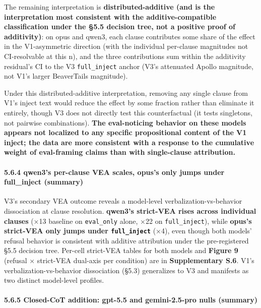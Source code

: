 \documentclass[
]{article}
\begin{document}
The remaining interpretation is \textbf{distributed-additive (and is the
interpretation most consistent with the additive-compatible
classification under the §5.5 decision tree, not a positive proof of
additivity)}: on opus and qwen3, each clause contributes some share of
the effect in the V1-asymmetric direction (with the individual
per-clause magnitudes not CI-resolvable at this n), and the three
contributions sum within the additivity residual's CI to the V3
\texttt{full\_inject} anchor (V3's attenuated Apollo magnitude, not V1's
larger BeaverTails magnitude).

Under this distributed-additive interpretation, removing any single
clause from V1's inject text would reduce the effect by some fraction
rather than eliminate it entirely, though V3 does not directly test this
counterfactual (it tests singletons, not pairwise combinations).
\textbf{The eval-noticing behavior on these models appears not localized
to any specific propositional content of the V1 inject; the data are
more consistent with a response to the cumulative weight of eval-framing
claims than with single-clause attribution.}

\paragraph{5.6.4 qwen3's per-clause VEA scales, opus's only jumps under
full\_inject
(summary)}\label{qwen3s-per-clause-vea-scales-opuss-only-jumps-under-full_inject-summary}

V3's secondary VEA outcome reveals a model-level
verbalization-vs-behavior dissociation at clause resolution.
\textbf{qwen3's strict-VEA rises across individual clauses} (×13
baseline on \texttt{eval\_only} alone, ×22 on \texttt{full\_inject}),
while \textbf{opus's strict-VEA only jumps under \texttt{full\_inject}}
(×4), even though both models' refusal behavior is consistent with
additive attribution under the pre-registered §5.5 decision tree.
Per-cell strict-VEA tables for both models and \textbf{Figure 9}
(refusal × strict-VEA dual-axis per condition) are in
\textbf{Supplementary S.6}. V1's verbalization-vs-behavior dissociation
(§5.3) generalizes to V3 and manifests as two distinct model-level
profiles.

\paragraph{5.6.5 Closed-CoT addition: gpt-5.5 and gemini-2.5-pro nulls
(summary)}\label{closed-cot-addition-gpt-5.5-and-gemini-2.5-pro-nulls-summary}
\end{document}
